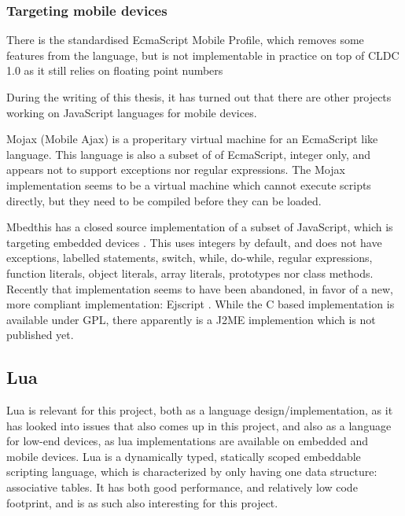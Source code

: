 \documentclass[11pt]{report}
\begin{document}
\subsubsection{Targeting mobile devices}

There is the standardised EcmaScript Mobile Profile, which removes some features from the language, but is not implementable in practice on top of CLDC 1.0 as it still relies on floating point numbers

During the writing of this thesis, it has turned out that there are other projects working on JavaScript languages for mobile devices.

Mojax (Mobile Ajax) \cite{mojax} is a properitary virtual machine for an EcmaScript like language. This language is also a subset of of EcmaScript, integer only, and appears not to support exceptions nor regular expressions.
The Mojax implementation seems to be a virtual machine which cannot execute scripts directly, but they need to be compiled before they can be loaded.

Mbedthis has a closed source implementation of a subset of JavaScript, which is targeting embedded devices \cite{mbedthis}. This uses integers by default, and does not have exceptions, labelled statements, switch, while, do-while, regular expressions, function literals, object literals, array literals, prototypes nor class methods.
Recently that implementation seems to have been abandoned, in favor of a new, more compliant implementation: Ejscript \cite{ejscript}.
While the C based implementation is available under GPL, there apparently is a J2ME implemention which is not published yet.

\subsection{Lua}
Lua is relevant for this project, both as a language design/implementation, as it has looked into issues that also comes up in this project, and also as a language for low-end devices, as lua implementations are available on embedded and mobile devices.
Lua is a dynamically typed, statically scoped embeddable scripting language, which is characterized by only having one data structure: associative tables.
It has both good performance, and relatively low code footprint, and is as such also interesting for this project.
\end{document}
